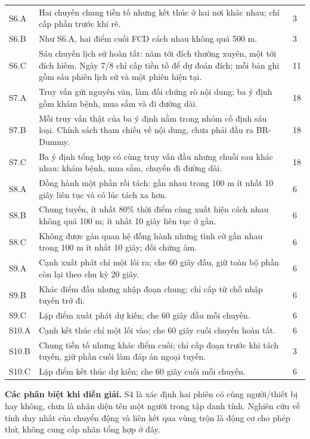 \begin{longtable}{P{1.0cm}P{11.0cm}P{1.0cm}}
S6.A & Hai chuyến chung tiền tố nhưng kết thúc ở hai nơi khác nhau; chỉ cấp phần trước khi rẽ. & 3\\
S6.B & Như S6.A, hai điểm cuối FCD cách nhau không quá 500 m. & 3\\
S6.C & Sáu chuyến lịch sử hoàn tất: năm tới đích thường xuyên, một tới đích hiếm. Ngày 7/8 chỉ cấp tiền tố để dự đoán đích; mỗi bản ghi gồm sáu phiên lịch sử và một phiên hiện tại. & 11\\\midrule
S7.A & Truy vấn gửi nguyên văn, làm đối chứng rò nội dung; ba ý định gồm khám bệnh, mua sắm và đi đường dài. & 18\\
S7.B & Mỗi truy vấn thật của ba ý định nằm trong nhóm cố định sáu loại. Chính sách tham chiếu về nội dung, chưa phải đầu ra BR-Dummy. & 18\\
S7.C & Ba ý định tổng hợp có cùng truy vấn đầu nhưng chuỗi sau khác nhau: khám bệnh, mua sắm, chuyến đi đường dài. & 18\\\midrule
S8.A & Đồng hành một phần rồi tách: gần nhau trong 100 m ít nhất 10 giây liên tục và có lúc tách xa hơn. & 6\\
S8.B & Chung tuyến, ít nhất 80\% thời điểm cùng xuất hiện cách nhau không quá 100 m; ít nhất 10 giây liên tục ở gần. & 6\\
S8.C & Không được gán quan hệ đồng hành nhưng tình cờ gần nhau trong 100 m ít nhất 10 giây; đối chứng âm. & 6\\\midrule
S9.A & Cạnh xuất phát chỉ một lối ra; che 60 giây đầu, giữ toàn bộ phần còn lại theo chu kỳ 20 giây. & 6\\
S9.B & Khác điểm đầu nhưng nhập đoạn chung; chỉ cấp từ chỗ nhập tuyến trở đi. & 6\\
S9.C & Lặp điểm xuất phát dự kiến; che 60 giây đầu mỗi chuyến. & 6\\\midrule
S10.A & Cạnh kết thúc chỉ một lối vào; che 60 giây cuối chuyến hoàn tất. & 6\\
S10.B & Chung tiền tố nhưng khác điểm cuối; chỉ cấp đoạn trước khi tách tuyến, giữ phần cuối làm đáp án ngoại tuyến. & 3\\
S10.C & Lặp điểm kết thúc dự kiến; che 60 giây cuối mỗi chuyến. & 6\\
\end{longtable}
\endgroup

\noindent\textbf{Các phân biệt khi diễn giải.}
S4 là xác định hai phiên có cùng người/thiết bị hay không, chưa là nhận diện tên một người trong tập danh tính. Nghiên cứu về tính duy nhất của chuyển động và liên kết qua vùng trộn là động cơ cho phép thử, không cung cấp nhãn tổng hợp ở đây.~\citep{demontjoye2013unique,beresford2004mixzones}

